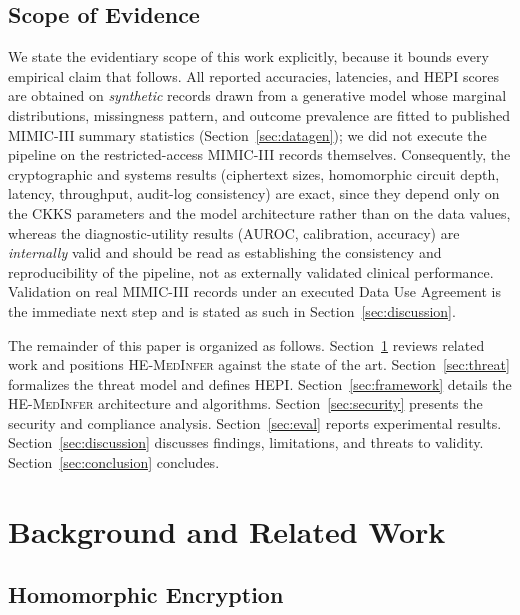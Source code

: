 \documentclass[journal,compsoc]{IEEEtran}
\newcommand{\HEPI}{\textsc{HEPI}}          %
\newcommand{\framework}{\textsc{HE-MedInfer}}
\begin{document}
\subsection*{Scope of Evidence}

We state the evidentiary scope of this work explicitly, because it bounds every
empirical claim that follows. All reported accuracies, latencies, and \HEPI{}
scores are obtained on \emph{synthetic} records drawn from a generative model
whose marginal distributions, missingness pattern, and outcome prevalence are
fitted to published MIMIC-III summary statistics
(Section~\ref{sec:datagen}); we did not execute the pipeline on the
restricted-access MIMIC-III records themselves. Consequently, the cryptographic
and systems results (ciphertext sizes, homomorphic circuit depth, latency,
throughput, audit-log consistency) are exact, since they depend only on the
CKKS parameters and the model architecture rather than on the data values,
whereas the diagnostic-utility results (AUROC, calibration, accuracy) are
\emph{internally} valid and should be read as establishing the consistency and
reproducibility of the pipeline, not as externally validated clinical
performance. Validation on real MIMIC-III records under an executed Data Use
Agreement is the immediate next step and is stated as such in
Section~\ref{sec:discussion}.

The remainder of this paper is organized as follows. Section~\ref{sec:related}
reviews related work and positions \framework{} against the state of the art.
Section~\ref{sec:threat} formalizes the threat model and defines \HEPI{}.
Section~\ref{sec:framework} details the \framework{} architecture and
algorithms. Section~\ref{sec:security} presents the security and compliance
analysis. Section~\ref{sec:eval} reports experimental results.
Section~\ref{sec:discussion} discusses findings, limitations, and threats to
validity. Section~\ref{sec:conclusion} concludes.

\section{Background and Related Work}
\label{sec:related}

\subsection{Homomorphic Encryption}
\end{document}
